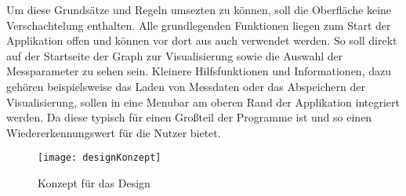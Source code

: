 Um diese Grundsätze und Regeln umsezten zu können, soll die Oberfläche keine Verschachtelung enthalten. Alle grundlegenden Funktionen liegen zum Start der Applikation offen und können vor dort aus auch verwendet werden. So soll direkt auf der Startseite der Graph zur Visualisierung sowie die Auswahl der Messparameter zu sehen sein. Kleinere Hilfsfunktionen und Informationen, dazu gehören beispielsweise das Laden von Messdaten oder das Abspeichern der Visualisierung, sollen in eine Menubar am oberen Rand der Applikation integriert werden. Da diese typisch für einen Großteil der Programme ist und so einen Wiedererkennungswert für die Nutzer bietet. 

\begin{figure}[H]
	\centering
	\texttt{[image: designKonzept]}
	\caption{Konzept für das Design}
	\label{fig:designKonzept}
\end{figure}